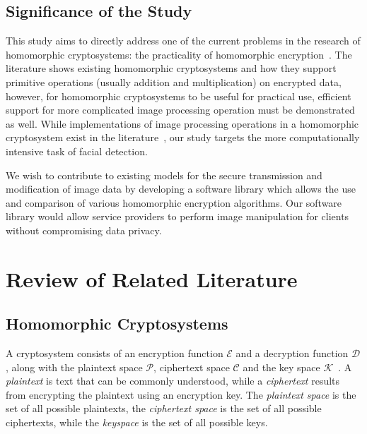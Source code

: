 \subsection{Significance of the Study}
This study aims to directly address one of the current problems in the research of homomorphic cryptosystems: the practicality of homomorphic encryption~\cite{sen_homomorphic_2013}. The literature shows existing homomorphic cryptosystems and how they support primitive operations (usually addition and multiplication) on encrypted data, however, for homomorphic cryptosystems to be useful for practical use, efficient support for more complicated image processing operation must be demonstrated as well. While implementations of image processing operations in a homomorphic cryptosystem exist in the literature~\cite{ziad_cryptoimg:_2016, garay_algorithms_2014}, our study targets the more computationally intensive task of facial detection.

We wish to contribute to existing models for the secure transmission and modification of image data by developing a software library which allows the use and comparison of various homomorphic encryption algorithms. Our software library would allow service providers to perform image manipulation for clients without compromising data privacy.


\section{Review of Related Literature}
\subsection{Homomorphic Cryptosystems}
A cryptosystem consists of an encryption function $\mathcal{E}$ and a decryption function $\mathcal{D}$, along with the plaintext space $\mathcal{P}$, ciphertext space $\mathcal{C}$ and the key space $\mathcal{K}$~\cite{bauer_cryptosystem_2005}. A \textit{plaintext} is text that can be commonly understood, while a \textit{ciphertext} results from encrypting the plaintext using an encryption key. The \textit{plaintext space} is the set of all possible plaintexts, the \textit{ciphertext space} is the set of all possible ciphertexts, while the \textit{keyspace} is the set of all possible keys.


